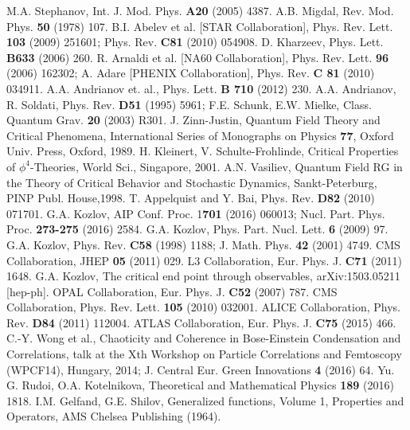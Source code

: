 \documentclass[WPCF,manyauthors]{wpcfTemplate}
\begin{document}
\begin{thebibliography}{30}

M.A. Stephanov, Int. J. Mod. Phys.  {\bf A20} (2005) 4387.
A.B. Migdal, Rev. Mod. Phys.  {\bf 50} (1978) 107.
B.I. Abelev et al. [STAR Collaboration],  Phys. Rev. Lett.  {\bf 103} (2009) 251601; Phys. Rev. {\bf C81} (2010) 054908.
D. Kharzeev, Phys. Lett.  {\bf B633} (2006) 260.
R. Arnaldi et al. [NA60 Collaboration],  Phys. Rev. Lett.  {\bf 96} (2006) 162302; A. Adare [PHENIX Collaboration], Phys. Rev. {\bf C 81} (2010) 034911.
A.A. Andrianov et. al.,  Phys. Lett.  {\bf B 710} (2012) 230.
A.A. Andrianov, R. Soldati,  Phys. Rev.  {\bf D51} (1995) 5961; F.E. Schunk, E.W. Mielke, Class. Quantum Grav. {\bf 20} (2003) R301.
J. Zinn-Justin, Quantum Field Theory and Critical Phenomena, International Series of Monographs on Physics {\bf 77}, Oxford Univ. Press, Oxford, 1989.
H. Kleinert, V. Schulte-Frohlinde, Critical Properties of $\phi^{4}$-Theories, World Sci., Singapore, 2001.
A.N. Vasiliev, Quantum Field RG in the Theory of Critical Behavior and Stochastic Dynamics, Sankt-Peterburg, PINP Publ. House,1998.
T. Appelquist and Y. Bai, Phys. Rev. {\bf D82} (2010) 071701.
G.A. Kozlov, AIP Conf. Proc. {1\bf 701} (2016) 060013; Nucl. Part. Phys. Proc. {\bf 273-275} (2016) 2584.
G.A. Kozlov,  Phys. Part. Nucl. Lett. {\bf 6} (2009) 97.
G.A. Kozlov,  Phys. Rev. {\bf C58} (1998) 1188; J. Math. Phys. {\bf 42} (2001) 4749.
CMS Collaboration, JHEP {\bf 05} (2011) 029.
L3 Collaboration, Eur. Phys. J. {\bf C71} (2011) 1648.
G.A. Kozlov,  The critical end point through observables, arXiv:1503.05211 [hep-ph].
OPAL Collaboration, Eur. Phys. J. {\bf C52} (2007) 787.
CMS Collaboration, Phys. Rev. Lett. {\bf 105} (2010) 032001.
ALICE Collaboration, Phys. Rev. {\bf D84} (2011) 112004.
ATLAS Collaboration, Eur. Phys. J. {\bf C75} (2015) 466.
C.-Y. Wong et al.,  Chaoticity and Coherence in Bose-Einstein Condensation and Correlations, talk at the Xth Workshop on Particle Correlations and Femtoscopy (WPCF14), Hungary, 2014; J. Central Eur. Green Innovations {\bf 4} (2016) 64. 
Yu. G. Rudoi, O.A. Kotelnikova, Theoretical and Mathematical Physics {\bf 189} (2016) 1818. 
I.M. Gelfand, G.E. Shilov, Generalized functions, Volume 1, Properties and Operators, AMS Chelsea Publishing  (1964). 

\end{thebibliography}
\end{document}
